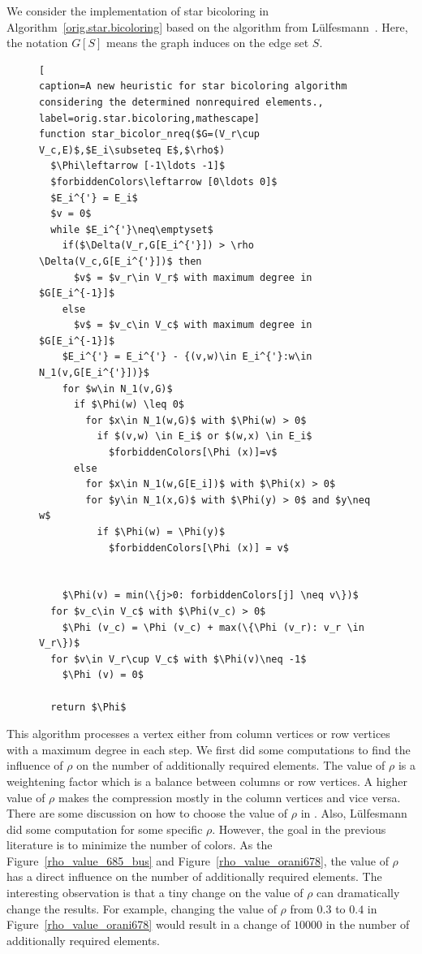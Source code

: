 \documentclass[12pt, twoside,a4paper,toc=bibliography]{scrbook}
\newcommand{\figref}[1]{Figure~\protect\ref{#1}}
\newcommand{\coderef}[1]{Algorithm~\protect\ref{#1}}
\begin{document}
We consider the implementation of star bicoloring in \coderef{orig.star.bicoloring} based on
the algorithm from Lülfesmann~\cite{Lulfesmann2012Fap}.
Here, the notation $G[S]$ means the graph induces on the edge set $S$.
\begin{figure}
\begin{lstlisting}[
caption=A new heuristic for star bicoloring algorithm
considering the determined nonrequired elements.,
label=orig.star.bicoloring,mathescape]
function star_bicolor_nreq($G=(V_r\cup V_c,E)$,$E_i\subseteq E$,$\rho$)
  $\Phi\leftarrow [-1\ldots -1]$
  $forbiddenColors\leftarrow [0\ldots 0]$
  $E_i^{'} = E_i$
  $v = 0$
  while $E_i^{'}\neq\emptyset$
    if($\Delta(V_r,G[E_i^{'}]) > \rho \Delta(V_c,G[E_i^{'}])$ then
      $v$ = $v_r\in V_r$ with maximum degree in $G[E_i^{-1}]$
    else
      $v$ = $v_c\in V_c$ with maximum degree in $G[E_i^{-1}]$
    $E_i^{'} = E_i^{'} - {(v,w)\in E_i^{'}:w\in N_1(v,G[E_i^{'}])}$
    for $w\in N_1(v,G)$
      if $\Phi(w) \leq 0$
        for $x\in N_1(w,G)$ with $\Phi(w) > 0$
          if $(v,w) \in E_i$ or $(w,x) \in E_i$
            $forbiddenColors[\Phi (x)]=v$
      else
        for $x\in N_1(w,G[E_i])$ with $\Phi(x) > 0$
        for $y\in N_1(x,G)$ with $\Phi(y) > 0$ and $y\neq w$
          if $\Phi(w) = \Phi(y)$
            $forbiddenColors[\Phi (x)] = v$
            

    $\Phi(v) = min(\{j>0: forbiddenColors[j] \neq v\})$
  for $v_c\in V_c$ with $\Phi(v_c) > 0$
    $\Phi (v_c) = \Phi (v_c) + max(\{\Phi (v_r): v_r \in V_r\})$
  for $v\in V_r\cup V_c$ with $\Phi(v)\neq -1$
    $\Phi (v) = 0$

  return $\Phi$
\end{lstlisting}
\end{figure}
This algorithm processes a vertex either from column vertices
or row vertices with a maximum degree in each step.
We first did some computations to find the influence of $\rho$ on the
number of additionally required elements. The value of $\rho$ is a weightening factor which
is a balance between columns or row vertices. A higher value of $\rho$
makes the compression mostly in the column vertices and vice versa.
There are some discussion on how to choose the value of $\rho$ in
\cite{Gebremedhin05whatcolor}. Also,
Lülfesmann~\cite{Lulfesmann2012Fap,LulfesmannMaster} did some computation for some
specific $\rho$.
However, the goal in the previous literature
is to minimize the number of colors.
As the \figref{rho_value_685_bus} and \figref{rho_value_orani678},
the value of $\rho$ has a direct influence on
the number of additionally required elements.
The interesting observation is that a tiny change
on the value of $\rho$ can dramatically change the
results. For example, changing the value of $\rho$ from
$0.3$ to $0.4$ in \figref{rho_value_orani678} would result
in a change of $10000$ in the number of additionally required elements.
\end{document}
